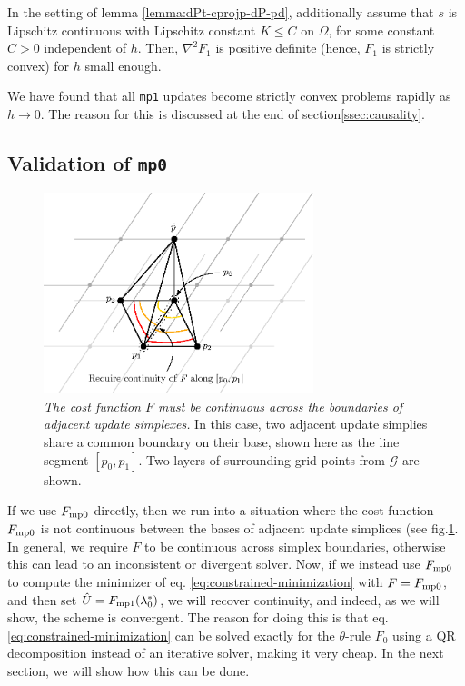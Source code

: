 \documentclass[smallcondensed]{svjour3}
\begin{document}
\begin{lemma}\label{lemma:F-strictly-convex}
  In the setting of lemma \ref{lemma:dPt-cprojp-dP-pd}, additionally
  assume that $s$ is Lipschitz continuous with Lipschitz constant
  $K \leq C$ on $\Omega$, for some constant $C > 0$ independent of
  $h$. Then, $\nabla^2 F_1$ is positive definite (hence, $F_1$ is
  strictly convex) for $h$ small enough.
\end{lemma}

We have found that all \texttt{mp1} updates become strictly convex
problems rapidly as $h \to 0$. The reason for this is discussed at the
end of section\@ \ref{ssec:causality}.

\subsection{Validation of \texttt{mp0}}\label{ssec:validation}

\begin{figure}
  \centering
  \includegraphics[width=0.7\textwidth]{continuity.eps}
  \caption{\emph{The cost function $F$ must be continuous across the
      boundaries of adjacent update simplexes.} In this case, two
    adjacent update simplies share a common boundary on their base,
    shown here as the line segment $[p_0, p_1]$. Two layers of
    surrounding grid points from $\mathcal{G}$ are
    shown.}\label{fig:continuity}
\end{figure}

If we use $F_{\operatorname{mp0}}$ directly, then we run into a situation where the
cost function $F_{\operatorname{mp0}}$ is not continuous between the bases of
adjacent update simplices (see fig.\@ \ref{fig:continuity}. In
general, we require $F$ to be continuous across simplex boundaries,
otherwise this can lead to an inconsistent or divergent solver. Now,
if we instead use $F_{\operatorname{mp0}}$ to compute the minimizer of eq.\@
\ref{eq:constrained-minimization} with $F = F_{\operatorname{mp0}}$, and then set
$\hat{U} = F_{\operatorname{mp1}}(\lambda_0^*)$, we will recover continuity, and
indeed, as we will show, the scheme is convergent. The reason for
doing this is that eq.\@ \ref{eq:constrained-minimization} can be
solved exactly for the $\theta$-rule $F_0$ using a QR decomposition
instead of an iterative solver, making it very cheap. In the next
section, we will show how this can be done.
\end{document}
